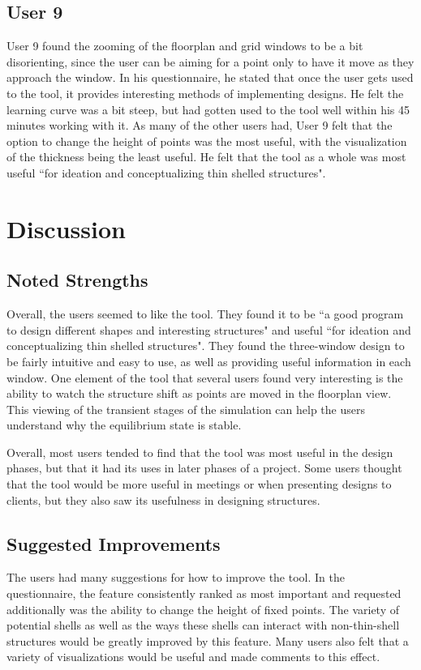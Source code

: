 \documentclass{thesis}
\begin{document}
\subsection{User 9}
User 9 found the zooming of the floorplan and grid windows to be a bit disorienting, since the user can be aiming for a point
only to have it move as they approach the window.  In his questionnaire, he stated that once the user gets used to the tool,
it provides interesting methods of implementing designs.  He felt the learning curve was a bit steep, but had gotten used to
the tool well within his 45 minutes working with it.  As many of the other users had, User 9 felt that the option to change
the height of points was the most useful, with the visualization of the thickness being the least useful.  He felt that the
tool as a whole was most useful ``for ideation and conceptualizing thin shelled structures".


\section{Discussion}
\subsection{Noted Strengths}
Overall, the users seemed to like the tool.  They found it to be ``a good program to design different shapes and interesting
structures" and useful ``for ideation and conceptualizing thin shelled structures".  They found the three-window design to be
fairly intuitive and easy to use, as well as providing useful information in each window.  One element of the tool that
several users found very interesting is the ability to watch the structure shift as points are moved in the floorplan view.
This viewing of the transient stages of the simulation can help the users understand why the equilibrium state is stable.

Overall, most users tended to find that the tool was most useful in the design phases, but that it had its uses in later
phases of a project.  Some users thought that the tool would be more useful in meetings or when presenting designs to clients,
but they also saw its usefulness in designing structures.

\subsection{Suggested Improvements}
The users had many suggestions for how to improve the tool.  In the questionnaire, the feature consistently ranked as most
important and requested additionally was the ability to change the height of fixed points.  The variety of potential shells
as well as the ways these shells can interact with non-thin-shell structures would be greatly improved by this feature.
Many users also felt that a variety of visualizations would be useful and made comments to this effect.
\end{document}
